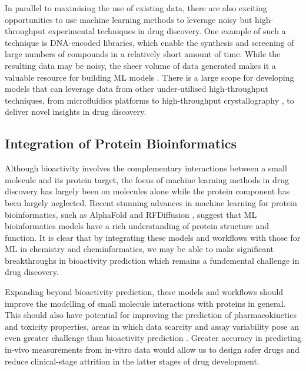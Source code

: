 In parallel to maximising the use of existing data, there are also exciting opportunities to use machine learning methods to leverage noisy but high-throughput experimental techniques in drug discovery. One example of such a technique is DNA-encoded libraries, which enable the synthesis and screening of large numbers of compounds in a relatively short amount of time. While the resulting data may be noisy, the sheer volume of data generated makes it a valuable resource for building ML models \cite{McCloskey2020DNALibrary, Blay20221DELTox, Lim2022DELCountML}. There is a large scope for developing models that can leverage data from other under-utilised high-throughput techniques, from microfluidics platforms \cite{Dittrich2006microfluidics, Skardal2016chip} to high-throughput crystallography \cite{Blundell2002HighThroughputCrystallography, Schiebel2016HighThroughput}, to deliver novel insights in drug discovery.

\subsection{Integration of Protein Bioinformatics}
Although bioactivity involves the complementary interactions between a small molecule and its protein target, the focus of machine learning methods in drug discovery has largely been on molecules alone while the protein component has been largely neglected. Recent stunning advances in machine learning for protein bioinformatics, such as AlphaFold \cite{Jumper2021AlphaFold} and RFDiffusion \cite{Watson2022RfDiffusion}, suggest that ML bioinformatics models have a rich understanding of protein structure and function. It is clear that by integrating these models and workflows with those for ML in chemistry and cheminformatics, we may be able to make significant breakthroughs in bioactivity prediction which remains a fundemental challenge in drug discovery.

Expanding beyond bioactivity prediction, these models and workflows should improve the modelling of small molecule interactions with proteins in general. This should also have potential for improving the prediction of pharmacokinetics and toxicity properties, areas in which data scarcity and assay variability pose an even greater challenge than bioactivity prediction \cite{Bhhatarai2019ADMEToxm, Wenzel2019ADMETox, Goller2020BayerADMET, Obrezanova2022InVivo}. Greater accuracy in predicting in-vivo measurements from in-vitro data would allow us to design safer drugs and reduce clinical-stage attrition in the latter stages of drug development.

